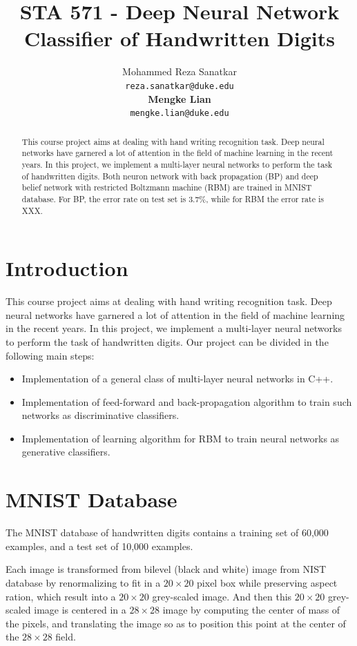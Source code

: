 \documentclass{article} %
\title{STA 571 - Deep Neural Network Classifier of Handwritten Digits}
\author{
Mohammed Reza Sanatkar \\
\texttt{reza.sanatkar@duke.edu} \\
\textbf{Mengke Lian} \\
\texttt{mengke.lian@duke.edu}
}
\begin{document}
\maketitle

\begin{abstract}
This course project aims at dealing with hand writing recognition task.
Deep neural networks have garnered a lot of attention in the field of machine learning in the recent years.
In this project, we implement a multi-layer neural networks to perform the task of handwritten digits.
Both neuron network with back propagation (BP) and deep belief network with restricted Boltzmann machine (RBM) are trained in MNIST database.
For BP, the error rate on test set is 3.7\%, while for RBM the error rate is XXX.
\end{abstract}

\section{Introduction}

This course project aims at dealing with hand writing recognition task.
Deep neural networks have garnered a lot of attention in the field of machine learning in the recent years. In this project, we implement a multi-layer neural networks to perform the task of handwritten digits. Our project can be divided in the following main steps:

\begin{itemize}
\item   Implementation of a general class of multi-layer neural networks in C++.
\item   Implementation of feed-forward and back-propagation algorithm to train such networks as discriminative classifiers.
\item   Implementation of learning algorithm for RBM to train neural networks as generative classifiers.
\end{itemize}

\section{MNIST Database}

The MNIST database of handwritten digits contains a training set of 60,000 examples, and a test set of 10,000 examples.

Each image is transformed from bilevel (black and white) image from NIST database by renormalizing to fit in a $20\times20$ pixel box while preserving aspect ration, which result into a $20\times20$ grey-scaled image.
And then this $20\times20$ grey-scaled image is centered in a $28\times28$ image by computing the center of mass of the pixels, and translating the image so as to position this point at the center of the $28\times28$ field.
\end{document}
